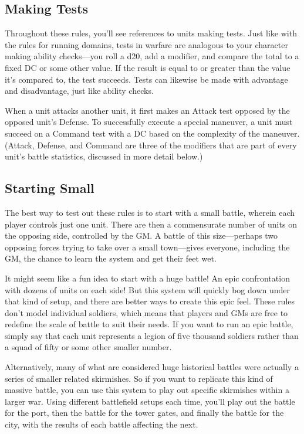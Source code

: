 \documentclass[10pt,a4paper,twoside,bg=print,twocolumn,openany,nodeprecatedcode]{dndbook}
\begin{document}
\subsection{Making Tests}
Throughout these rules, you'll see references to units making tests. Just like with the rules for running domains, tests in warfare are analogous to your character making ability checks—you roll a d20, add a modifier, and compare the total to a fixed DC or some other value. If the result is equal to or greater than the value it's compared to, the test succeeds. Tests can likewise be made with advantage and disadvantage, just like ability checks.

When a unit attacks another unit, it first makes an Attack test opposed by the opposed unit's Defense. To successfully execute a special maneuver, a unit must succeed on a Command test with a DC based on the complexity of the maneuver. (Attack, Defense, and Command are three of the modifiers that are part of every unit's battle statistics, discussed in more detail below.)

\subsection{Starting Small}
The best way to test out these rules is to start with a small battle, wherein each player controls just one unit. There are then a commensurate number of units on the opposing side, controlled by the GM. A battle of this size—perhaps two opposing forces trying to take over a small town—gives everyone, including the GM, the chance to learn the system and get their feet wet.

It might seem like a fun idea to start with a huge battle! An epic confrontation with dozens of units on each side! But this system will quickly bog down under that kind of setup, and there are better ways to create this epic feel. These rules don't model individual soldiers, which means that players and GMs are free to redefine the scale of battle to suit their needs. If you want to run an epic battle, simply say that each unit represents a legion of five thousand soldiers rather than a squad of fifty or some other smaller number.

Alternatively, many of what are considered huge historical battles were actually a series of smaller related skirmishes. So if you want to replicate this kind of massive battle, you can use this system to play out specific skirmishes within a larger war. Using different battlefield setups each time, you'll play out the battle for the port, then the battle for the tower gates, and finally the battle for the city, with the results of each battle affecting the next.
\end{document}
